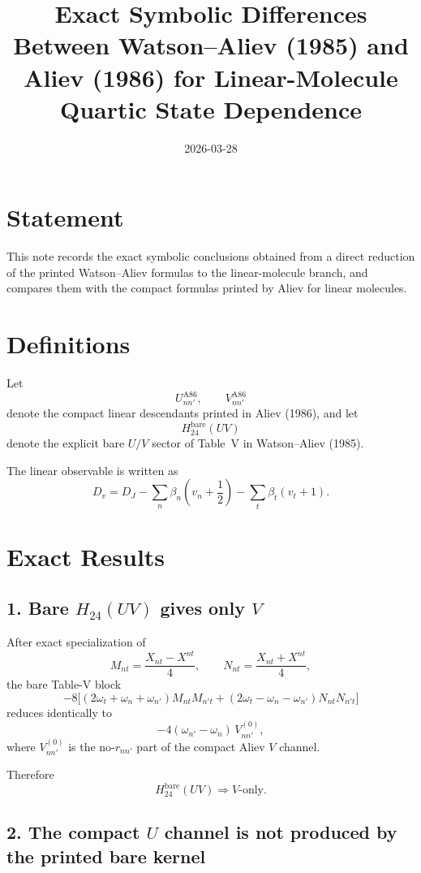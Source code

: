 \documentclass[11pt]{article}
\title{Exact Symbolic Differences Between Watson--Aliev (1985) and Aliev (1986) for Linear-Molecule Quartic State Dependence}
\author{}
\date{2026-03-28}
\begin{document}
\maketitle

\section*{Statement}

This note records the exact symbolic conclusions obtained from a direct reduction of the printed Watson--Aliev formulas to the linear-molecule branch, and compares them with the compact formulas printed by Aliev for linear molecules.

\section*{Definitions}

Let
\[
U_{nn'}^{\mathrm{A86}},\qquad V_{nn'}^{\mathrm{A86}}
\]
denote the compact linear descendants printed in Aliev (1986), and let
\[
H_{24}^{\mathrm{bare}}(UV)
\]
denote the explicit bare \(U/V\) sector of Table~V in Watson--Aliev (1985).

The linear observable is written as
\[
D_v = D_J - \sum_n \beta_n\left(v_n+\frac12\right)-\sum_t \beta_t(v_t+1).
\]

\section*{Exact Results}

\subsection*{1. Bare \(H_{24}(UV)\) gives only \(V\)}

After exact specialization of
\[
M_{nt}=\frac{X_{nt}-X^{nt}}{4},\qquad
N_{nt}=\frac{X_{nt}+X^{nt}}{4},
\]
the bare Table-V block
\[
-8\Big[(2\omega_t+\omega_n+\omega_{n'})M_{nt}M_{n't}
+
(2\omega_t-\omega_n-\omega_{n'})N_{nt}N_{n't}\Big]
\]
reduces identically to
\[
-4(\omega_{n'}-\omega_n)\,V_{nn'}^{(0)},
\]
where \(V_{nn'}^{(0)}\) is the no-\(r_{nn'}\) part of the compact Aliev \(V\) channel.

Therefore
\[
\boxed{H_{24}^{\mathrm{bare}}(UV)\Rightarrow V\text{-only}.}
\]

\subsection*{2. The compact \(U\) channel is not produced by the printed bare kernel}
\end{document}

